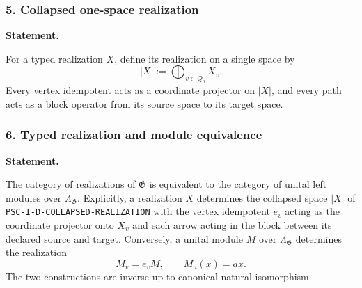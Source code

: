 \subsubsection*{5. Collapsed one-space realization}
\label{rec:PSC-I-D-COLLAPSED-REALIZATION}
\textbf{Statement.}\par
For a typed realization $X$, define its realization on a single space by
\[
|X|:=\bigoplus_{v\in Q_0}X_v.
\]
Every vertex idempotent acts as a coordinate projector on $|X|$, and every path acts as a block operator from its source space to its target space.
\subsubsection*{6. Typed realization and module equivalence}
\label{rec:PSC-I-T-TYPED-MODULE-EQUIVALENCE}
\textbf{Statement.}\par
The category of realizations of $\mathfrak G$ is equivalent to the category of unital left modules over $\Lambda_{\mathfrak G}$.  Explicitly, a realization $X$ determines the collapsed space $|X|$ of \hyperref[rec:PSC-I-D-COLLAPSED-REALIZATION]{\nolinkurl{PSC-I-D-COLLAPSED-REALIZATION}}
with the vertex idempotent $e_v$ acting as the coordinate projector onto $X_v$ and each arrow acting in the block between its declared source and target.  Conversely, a unital module $M$ over $\Lambda_{\mathfrak G}$ determines the realization
\[
M_v=e_vM,
\qquad
M_a(x)=ax.
\]
The two constructions are inverse up to canonical natural isomorphism.

